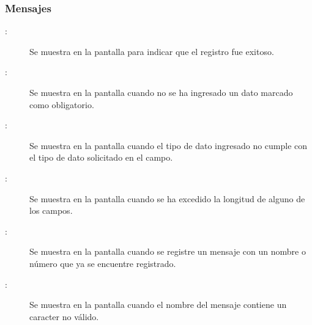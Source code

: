 \subsubsection{Mensajes}

	
\begin{description}
	\item[:] Se muestra en la pantalla  para indicar que el registro fue exitoso.
	\item[:] Se muestra en la pantalla  cuando no se ha ingresado un dato marcado como obligatorio.
	\item[:] Se muestra en la pantalla  cuando el tipo de dato ingresado no cumple con el tipo de dato solicitado en el campo.
	\item[:] Se muestra en la pantalla  cuando se ha excedido la longitud de alguno de los campos.
	\item[:] Se muestra en la pantalla  cuando se registre un mensaje con un nombre o número que ya se encuentre registrado.
	\item[:] Se muestra en la pantalla  cuando el nombre del mensaje contiene un caracter no válido.
\end{description}
